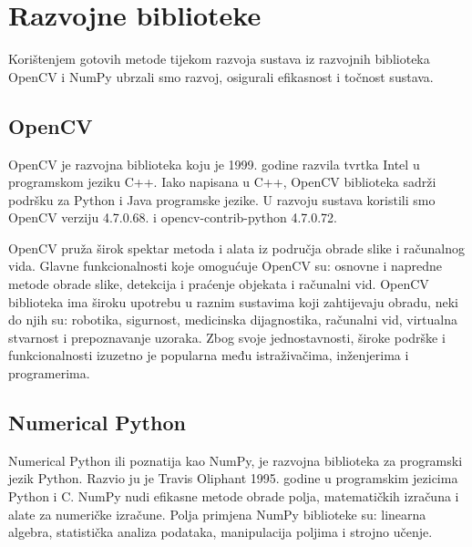 \documentclass[times, utf8, zavrsni, numeric]{fer}
\begin{document}
\section{Razvojne biblioteke}
Korištenjem gotovih metode tijekom razvoja sustava iz razvojnih biblioteka OpenCV i NumPy ubrzali smo razvoj, osigurali efikasnost i točnost sustava. 

\subsection{OpenCV}
OpenCV je razvojna biblioteka koju je 1999. godine razvila tvrtka Intel u programskom jeziku C++. Iako napisana u C++, OpenCV biblioteka sadrži podršku za Python i Java programske jezike. U razvoju sustava koristili smo OpenCV verziju 4.7.0.68. i opencv-contrib-python 4.7.0.72.

OpenCV pruža širok spektar metoda i alata iz područja obrade slike i računalnog vida. Glavne funkcionalnosti koje omogućuje OpenCV su: osnovne i napredne metode obrade slike, detekcija i praćenje objekata i računalni vid. OpenCV biblioteka ima široku upotrebu u raznim sustavima koji zahtijevaju obradu, neki do njih su: robotika, sigurnost, medicinska dijagnostika, računalni vid, virtualna stvarnost i prepoznavanje uzoraka. Zbog svoje jednostavnosti, široke podrške i funkcionalnosti izuzetno je popularna među istraživačima, inženjerima i programerima.

\subsection{Numerical Python}
Numerical Python ili poznatija kao NumPy, je razvojna biblioteka za programski jezik Python. Razvio ju je Travis Oliphant 1995. godine u programskim jezicima Python i C.
NumPy nudi efikasne metode obrade polja, matematičkih izračuna i alate za numeričke izračune. Polja primjena NumPy biblioteke su: linearna algebra, statistička analiza podataka, manipulacija poljima i strojno učenje.
\end{document}
